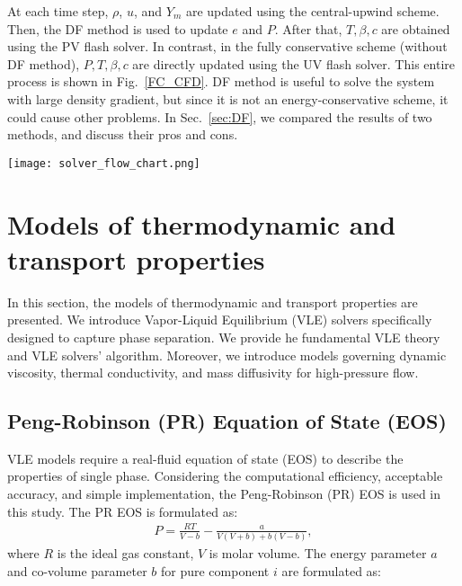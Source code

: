 At each time step, $\rho$, $u$, and $Y_m$ are updated using the central-upwind scheme. Then, the DF method is used to update $e$ and $P$. After that, $T,\beta,c$ are obtained using the PV flash solver. In contrast, in the fully conservative scheme (without DF method), $P,T,\beta,c$ are directly updated using the UV flash solver. This entire process is shown in Fig.~\ref{FC_CFD}. DF method is useful to solve the system with large density gradient, but since it is not an energy-conservative scheme, it could cause other problems. In Sec.~\ref{sec:DF}, we compared the results of two methods, and discuss their pros and cons.

\begin{figure*}[htbp]
	\centering
	\texttt{[image: solver\_flow\_chart.png]}
	\caption{Flow chart of the VLE-based CFD framework.}
	\label{FC_CFD}
\end{figure*}



\section{Models of thermodynamic and transport properties}

In this section, the models of thermodynamic and transport properties are presented. We introduce Vapor-Liquid Equilibrium (VLE) solvers specifically designed to capture phase separation.  We provide he fundamental VLE theory and VLE solvers' algorithm. Moreover, we introduce models governing dynamic viscosity, thermal conductivity, and mass diffusivity for high-pressure flow.


\subsection{Peng-Robinson (PR) Equation of State (EOS)}
VLE models require a real-fluid equation of state (EOS) to describe the properties of single phase. Considering the computational efficiency, acceptable accuracy, and simple implementation, the Peng-Robinson (PR) EOS \cite{peng1976new} is used in this study. The PR EOS is formulated as:
\begin{align}
	P=\frac{RT}{V-b}-\frac{a}{V\left(V+b\right)+b\left(V-b\right)}, %
	\label{eq:preos}
\end{align}
where $R$ is the ideal gas constant, $V$ is molar volume. The energy parameter $a$ and co-volume parameter $b$ for pure component $i$ are formulated as:

